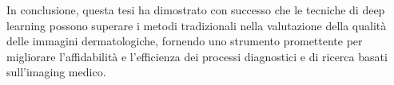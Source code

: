 In conclusione, questa tesi ha dimostrato con successo che le tecniche di deep learning possono superare i metodi tradizionali nella valutazione della qualità delle immagini dermatologiche, fornendo uno strumento promettente per migliorare l'affidabilità e l'efficienza dei processi diagnostici e di ricerca basati sull'imaging medico.
